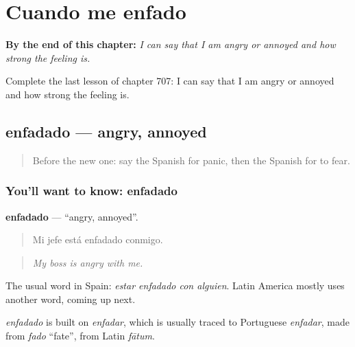 
\chapter{Cuando me enfado}
\label{ch:es-cuando-me-enfado}

\begin{chapteropening}
\textbf{By the end of this chapter:} \emph{I can say that I am angry or annoyed and how strong the feeling is.}

Complete the last lesson of chapter 707: I can say that I am angry or annoyed and how strong the feeling is.
\end{chapteropening}

\section[enfadado]{enfadado — angry, annoyed}

\label{lesson:ES-C707-enfadado}



\begin{quote}
Before the new one: say the Spanish for panic, then the Spanish for to fear.
\end{quote}

\subsection*{You'll want to know: enfadado}
\textbf{enfadado} — \textquotedblleft{}angry, annoyed\textquotedblright{}.

\begin{quote}
Mi jefe está enfadado conmigo.
\end{quote}

\begin{quote}
\emph{My boss is angry with me.}
\end{quote}

The usual word in Spain: \emph{estar enfadado con alguien}. Latin America mostly uses another word, coming up next.

\begin{cousinweb}
\emph{enfadado} is built on \emph{enfadar}, which is usually traced to Portuguese \emph{enfadar}, made from \emph{fado} \textquotedblleft{}fate\textquotedblright{}, from Latin \emph{fātum}.
\end{cousinweb}

